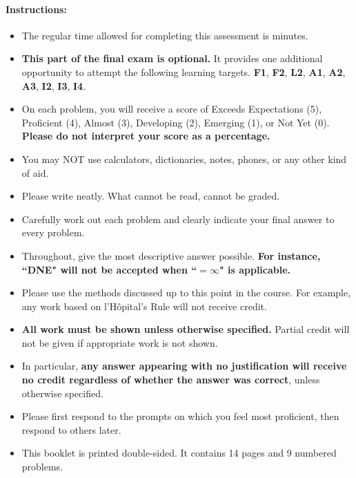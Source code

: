 \documentclass[11pt]{article}
\begin{document}
{%

\paragraph*{Instructions:}

\begin{itemize}
    
    \item The regular time allowed for completing this assessment is  minutes.
    \item \textbf{This part of the final exam is optional.} It provides one additional opportunity to attempt the following learning targets.
    {\bf\color{ProcessBlue}F1}, {\bf\color{ProcessBlue}F2}, {\bf\color{RoyalBlue}L2}, {\bf\color{RedOrange}A1}, {\bf\color{RedOrange}A2}, {\bf\color{RedOrange}A3}, {\bf\color{Fuchsia}I2}, {\bf\color{Fuchsia}I3}, {\bf\color{Fuchsia}I4}.
    \item On each problem, you will receive a score of Exceeds Expectations (5), Proficient (4), Almost (3), Developing (2), Emerging (1), or Not Yet (0). {\bf Please do not interpret your score as a percentage.}
    \item You may NOT use calculators, dictionaries, notes, phones, or any other kind of aid.
    \item Please write neatly. What cannot be read, cannot be graded.
    \item Carefully work out each problem and clearly indicate your final answer to every problem.
    \item Throughout, give the most descriptive answer possible. \textbf{For instance, ``DNE" will not be accepted when ``$=\infty$" is applicable.}
    \item Please use the methods discussed up to this point in the course. For example, any work based on l'H\^opital's Rule will not receive credit.
    \item \textbf{All work must be shown unless otherwise specified.} Partial credit will not be given if appropriate work is not shown.
    \item In particular, {\bf any answer appearing with no justification will receive no credit regardless of whether the answer was correct}, unless otherwise specified.
    \item Please first respond to the prompts on which you feel most proficient, then respond to others later.
    \item This booklet is printed double-sided. It contains 14 pages and 9 numbered problems.
    \end{itemize}
    
    }
\end{document}
